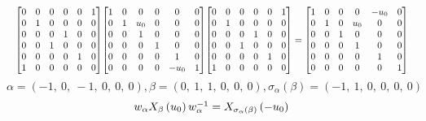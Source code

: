 \documentclass[11pt]{article}
\theoremstyle{definition}
\begin{document}
\[
\scaletoalign{\textwidth}{{\left[\begin{matrix}0 & 0 & 0 & 0 & 0 & 1\\0 & 1 & 0 & 0 & 0 & 0\\0 & 0 & 0 & 1 & 0 & 0\\0 & 0 & 1 & 0 & 0 & 0\\0 & 0 & 0 & 0 & 1 & 0\\1 & 0 & 0 & 0 & 0 & 0\end{matrix}\right]} {\left[\begin{matrix}1 & 0 & 0 & 0 & 0 & 0\\0 & 1 & u_{0} & 0 & 0 & 0\\0 & 0 & 1 & 0 & 0 & 0\\0 & 0 & 0 & 1 & 0 & 0\\0 & 0 & 0 & 0 & 1 & 0\\0 & 0 & 0 & 0 & - u_{0} & 1\end{matrix}\right]} {\left[\begin{matrix}0 & 0 & 0 & 0 & 0 & 1\\0 & 1 & 0 & 0 & 0 & 0\\0 & 0 & 0 & 1 & 0 & 0\\0 & 0 & 1 & 0 & 0 & 0\\0 & 0 & 0 & 0 & 1 & 0\\1 & 0 & 0 & 0 & 0 & 0\end{matrix}\right]} = {\left[\begin{matrix}1 & 0 & 0 & 0 & - u_{0} & 0\\0 & 1 & 0 & u_{0} & 0 & 0\\0 & 0 & 1 & 0 & 0 & 0\\0 & 0 & 0 & 1 & 0 & 0\\0 & 0 & 0 & 0 & 1 & 0\\0 & 0 & 0 & 0 & 0 & 1\end{matrix}\right]}}
\]
\[
\alpha = \left( -1, \  0, \  -1, \  0, \  0, \  0\right), \beta = \left( 0, \  1, \  1, \  0, \  0, \  0\right), \sigma_{\alpha}(\beta) = \left( -1, \  1, \  0, \  0, \  0, \  0\right)
\]
\[
\scaletoalign{\textwidth}{w_{\alpha} X_{\beta}\left(u_{0}\right) w_{\alpha}^{-1} = X_{\sigma_{\alpha}\left(\beta\right)}\left(- u_{0}\right)}
\]
\end{document}
